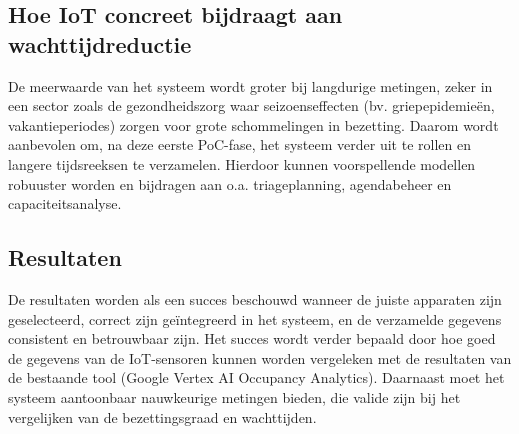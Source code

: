 

\subsection{Hoe IoT concreet bijdraagt aan wachttijdreductie}
De meerwaarde van het systeem wordt groter bij langdurige metingen, zeker in een sector zoals de gezondheidszorg waar seizoenseffecten (bv. griepepidemieën, vakantieperiodes) zorgen voor grote schommelingen in bezetting. Daarom wordt aanbevolen om, na deze eerste PoC-fase, het systeem verder uit te rollen en langere tijdsreeksen te verzamelen. Hierdoor kunnen voorspellende modellen robuuster worden en bijdragen aan o.a. triageplanning, agendabeheer en capaciteitsanalyse.

\subsection{Resultaten}
De resultaten worden als een succes beschouwd wanneer de juiste apparaten zijn geselecteerd, correct zijn geïntegreerd in het systeem, en de verzamelde gegevens consistent en betrouwbaar zijn. Het succes wordt verder bepaald door hoe goed de gegevens van de IoT-sensoren kunnen worden vergeleken met de resultaten van de bestaande tool (Google Vertex AI Occupancy Analytics). Daarnaast moet het systeem aantoonbaar nauwkeurige metingen bieden, die valide zijn bij het vergelijken van de bezettingsgraad en wachttijden. \\

